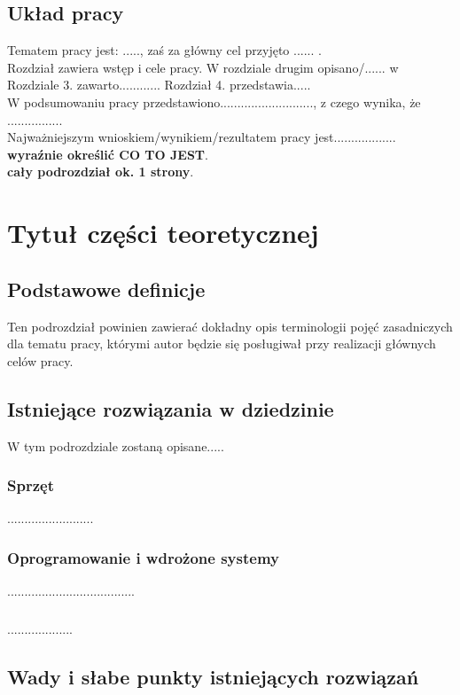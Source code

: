 \documentclass[12pt]{report}
\begin{document}
\section{Układ pracy}
Tematem pracy jest: ....., zaś za główny cel przyjęto ...... . \\
Rozdział \label{rozdz.wstep} zawiera wstęp i cele pracy. W rozdziale drugim
opisano/...... w Rozdziale 3. zawarto............ Rozdział 4. przedstawia..... \\
W podsumowaniu pracy przedstawiono..........................., z czego wynika,
że ................  \\
Najważniejszym wnioskiem/wynikiem/rezultatem pracy jest..................\\ {\bf wyraźnie określić
CO TO JEST}. \\

{\bf cały podrozdział ok. 1 strony}.




\chapter{Tytuł części teoretycznej} \label{etykietarozdzialu2}
\section{Podstawowe definicje}
Ten podrozdział powinien zawierać dokładny opis terminologii  pojęć zasadniczych dla tematu pracy, którymi autor będzie się posługiwał przy realizacji głównych celów pracy. 


\section{Istniejące rozwiązania w dziedzinie}
W tym podrozdziale zostaną opisane.....
\subsection{Sprzęt}
.........................
\subsection{Oprogramowanie i wdrożone systemy}
.....................................
\subsection{}
...................

\section{Wady i słabe punkty istniejących rozwiązań}
\end{document}
